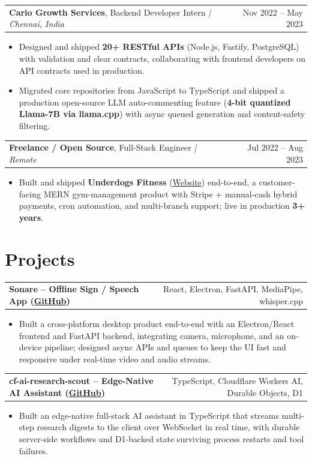 \documentclass[letterpaper,11pt]{article}
\makeatletter
\newcommand{\expItem}[4]{%
  \vspace{3pt}
  \begin{tabular*}{\textwidth}{@{}l@{\extracolsep{\fill}}r@{}}
    \textbf{#1}, #2 \textit{| #3} & #4 \\
  \end{tabular*}\par\vspace{-2pt}
}
\newcommand{\projItem}[2]{%
  \vspace{6pt}
  \begin{tabular*}{\textwidth}{@{}l@{\extracolsep{\fill}}r@{}}
    \textbf{#1} & #2 \\
  \end{tabular*}\par\vspace{-2pt}
}
\makeatother
\begin{document}
\expItem{Cario Growth Services}{Backend Developer Intern}{Chennai, India}{Nov 2022 -- May 2023}
\begin{itemize}
  \item Designed and shipped \textbf{20+ RESTful APIs} (Node.js, Fastify, PostgreSQL) with validation and clear contracts, collaborating with frontend developers on API contracts used in production.
  \item Migrated core repositories from JavaScript to TypeScript and shipped a production open-source LLM auto-commenting feature (\textbf{4-bit quantized Llama-7B via llama.cpp}) with async queued generation and content-safety filtering.
\end{itemize}

\expItem{Freelance / Open Source}{Full-Stack Engineer}{Remote}{Jul 2022 -- Aug 2023}
\begin{itemize}
  \item Built and shipped \textbf{Underdogs Fitness} (\href{https://www.underdogsfitness.in/}{Website}) end-to-end, a customer-facing MERN gym-management product with Stripe + manual-cash hybrid payments, cron automation, and multi-branch support; live in production \textbf{3+ years}.
\end{itemize}

\section{Projects}

\projItem{Sonare -- Offline Sign / Speech App {\normalfont\small(\href{https://github.com/Deva-1903/Qualcomm-Sep25-Team-Sonare}{GitHub})}}{React, Electron, FastAPI, MediaPipe, whisper.cpp}
\begin{itemize}
  \item Built a cross-platform desktop product end-to-end with an Electron/React frontend and FastAPI backend, integrating camera, microphone, and an on-device pipeline; designed async APIs and queues to keep the UI fast and responsive under real-time video and audio streams.
\end{itemize}

\projItem{cf-ai-research-scout -- Edge-Native AI Assistant {\normalfont\small(\href{https://github.com/Deva-1903/cf_ai_research_scout}{GitHub})}}{TypeScript, Cloudflare Workers AI, Durable Objects, D1}
\begin{itemize}
  \item Built an edge-native full-stack AI assistant in TypeScript that streams multi-step research digests to the client over WebSocket in real time, with durable server-side workflows and D1-backed state surviving process restarts and tool failures.
\end{itemize}
\end{document}
